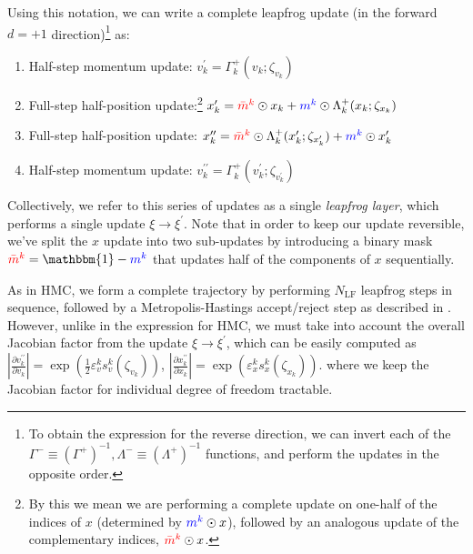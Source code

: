 \documentclass{article} %
\newcommand{\mbart}{\textcolor{red}{\bar{m}^{k}}}
\newcommand{\mt}{\textcolor{blue}{m^{k}}}
\begin{document}
Using this notation, we can write a complete leapfrog update (in the forward \(d=+1\) direction)\footnote{%
   To obtain the expression for the reverse direction, we can invert each of the
   \(\Gamma^{-}\equiv{\left(\Gamma^{+}\right)}^{-1}, \Lambda^{-}\equiv{\left(\Lambda^{+}\right)}^{-1}\) functions, and
   perform the updates in the opposite order.
} as:
%
\begin{enumerate}
   \item Half-step momentum update:%
      \hspace{29pt}\(%
         v^{\prime}_{k} = \Gamma^{+}_{k}(v_{k};\zeta_{v_{k}})%
   \)
   \item Full-step half-position update:\footnote{%
         By this we mean we are performing a complete update on one-half of the indices of \(x\) (determined by
         \(\mt\odot x\)), followed by an analogous update of the complementary indices, \(\mbart\odot x\).
   }
      \hspace{14pt} \(%
         x^{\prime}_{k} = \mbart\odot x_{k} + \mt\odot \Lambda^{+}_{k}(x_{k};\zeta_{x_{k}})
   \)
   \item Full-step half-position update:%
      \hspace{21pt} \(%
         x^{\prime\prime}_{k} = \mbart\odot\Lambda^{+}_{k}(x^{\prime}_{k};\zeta_{x^{\prime}_{k}}) + \mt\odot x^{\prime}_{k}
   \)
   \item Half-step momentum update:%
      \hspace{25pt} \(%
         v^{\prime\prime}_{k} = \Gamma_{k}^{+}(v^{\prime}_{k}; \zeta_{v^{\prime}_{k}})
   \)
\end{enumerate}
%
Collectively, we refer to this series of updates as a single \emph{leapfrog layer}, which performs a single update \(\xi\rightarrow\xi^{\prime}\).
%
Note that in order to keep our update reversible, we've split the \(x\) update into two sub-updates by
introducing a binary mask \(\mbart = \mathbbm{1} - \mt\) that updates half of the components of \(x\) sequentially.
%

As in HMC, we form a complete trajectory by performing \(N_{\mathrm{LF}}\) leapfrog steps in sequence, followed by a Metropolis-Hastings accept/reject step as described in .
%
However, unlike in the expression for HMC, we must take into account the overall Jacobian factor from the update
\(\xi\rightarrow\xi^{\prime}\), which can be easily computed as \(\left|\tfrac{\partial v^{\prime\prime}_{k}}{\partial
   v_{k}}\right| = \exp{\left(\tfrac{1}{2}{\varepsilon^{k}_{v} s^{k}_{v}(\zeta_{v_{k}})}\right)}\),
   \(\left|\tfrac{\partial x^{\prime\prime}_{k}}{\partial x_{k}}\right| = \exp{\left(\varepsilon^{k}_{x} s^{k}_{x}(\zeta_{x_{k}})\right)}\).
where we keep the Jacobian factor for individual degree of freedom tractable.
%
%
\end{document}
